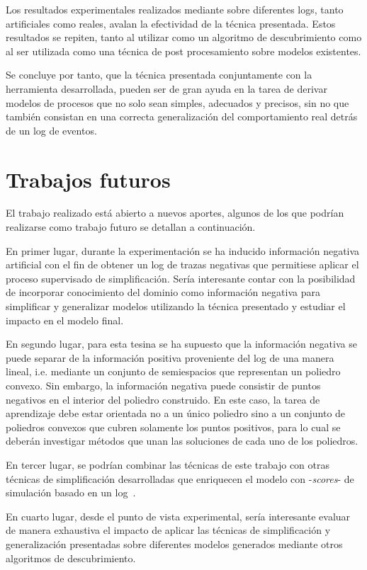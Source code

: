 Los resultados experimentales realizados mediante \pachtool sobre diferentes logs, tanto 
artificiales como reales, avalan la efectividad de la técnica presentada.
Estos resultados se repiten, tanto al utilizar \pachtool como un algoritmo de descubrimiento 
como al ser utilizada como una técnica de post procesamiento sobre modelos existentes.

Se concluye por tanto, que la técnica presentada conjuntamente con la herramienta desarrollada, pueden ser de
gran ayuda en la tarea de derivar modelos de procesos que no solo sean simples, adecuados y precisos, 
sin no que también consistan en una correcta generalización del comportamiento real detrás de un log de eventos.

\section*{Trabajos futuros}

El trabajo realizado está abierto a nuevos aportes, algunos de los que podrían realizarse como 
trabajo futuro se detallan a continuación.

En primer lugar, durante la experimentación se ha inducido información negativa artificial con el fin de obtener 
un log de trazas negativas que permitiese aplicar el proceso supervisado de simplificación. Sería 
interesante contar con la posibilidad de incorporar conocimiento del dominio como información
negativa para simplificar y generalizar modelos utilizando la técnica presentado y estudiar el 
impacto en el modelo final.

En segundo lugar, para esta tesina se ha supuesto que la información negativa se puede separar de la
información positiva proveniente del log de una manera lineal, i.e. mediante un conjunto de semiespacios
que representan un poliedro convexo. Sin embargo, la información negativa puede consistir de puntos negativos en el
interior del poliedro construido. En este caso, la tarea de aprendizaje debe estar orientada no a un único
poliedro sino a un conjunto de poliedros convexos que cubren solamente los puntos positivos, para lo cual
se deberán investigar métodos que unan las soluciones de cada uno de los poliedros.

En tercer lugar, se podrían combinar las técnicas de este trabajo con otras técnicas de simplificación
desarrolladas que enriquecen el modelo con  -\textit{scores}- de simulación basado en un log~\cite{PedroCC15}.

En cuarto lugar, desde el punto de vista experimental, sería interesante evaluar de manera exhaustiva el impacto de
aplicar las técnicas de simplificación y generalización presentadas sobre diferentes modelos generados mediante otros
algoritmos de descubrimiento.

